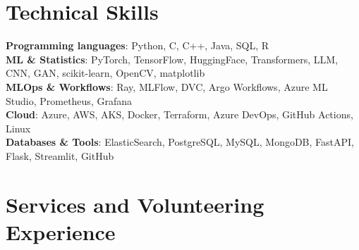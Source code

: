 \documentclass[letterpaper,11pt]{article}
\makeatletter
\newcommand{\resumeSubheading}[4]{
  \vspace{-2pt}\item
    \begin{tabular*}{0.97\textwidth}[t]{l@{\extracolsep{\fill}}r}
      \textbf{#1} & #2 \\
      \small#3 & \small #4 \\
    \end{tabular*}\vspace{-7pt}
}
\newcommand{\resumeSubHeadingListStart}{\begin{itemize}[leftmargin=0.15in, label={}]}
\newcommand{\resumeSubHeadingListEnd}{\end{itemize}}
\makeatother
\begin{document}
\section{Technical Skills}
 \begin{itemize}[leftmargin=0.15in, label={}]
    \small{\item{
     \textbf{Programming languages}{: Python, C, C++, Java, SQL, R} \\ \vspace{0.2pt}
     \textbf{ML \& Statistics}{: PyTorch, TensorFlow, HuggingFace, Transformers, LLM, CNN, GAN, scikit-learn, OpenCV, matplotlib} \\ \vspace{0.2pt}
     \textbf{MLOps \& Workflows}{: Ray, MLFlow, DVC, Argo Workflows, Azure ML Studio, Prometheus, Grafana} \\ \vspace{0.2pt}
     \textbf{Cloud}{: Azure, AWS, AKS, Docker, Terraform, Azure DevOps, GitHub Actions, Linux} \\ \vspace{0.2pt}
     \textbf{Databases \& Tools}{: ElasticSearch, PostgreSQL, MySQL, MongoDB, FastAPI, Flask, Streamlit, GitHub}
     }}
 \end{itemize}





\section{Services and Volunteering Experience}
\end{document}
